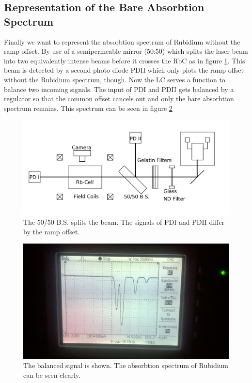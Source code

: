 \subsection{Representation of the Bare Absorbtion Spectrum}
Finally we want to represent the absorbtion spectrum of Rubidium without the ramp offset. By use of a semipermeable mirror (50:50) which splits the laser beam
into two equivalently intense beams before it crosses the RbC as in figure \ref{pic_setup3}. This beam is detected by a second photo diode PDII which only
plots the ramp offset without the Rubidium spectrum, though. Now the LC serves a function to balance two incoming signals. The input of PDI and PDII gets
balanced by a regulator so that the common offset cancels out and only the bare absorbtion spectrum remains. This spectrum can be seen in figure 
\ref{pic_spectrum}
\begin{figure}[H]
 \includegraphics[width=\textwidth]{../pics/setup3.png}
 \caption{The 50/50 B.S. splits the beam. The signals of PDI and PDII differ by the ramp offset.}
 \label{pic_setup3}
\end{figure}

\begin{figure}[H]
 \includegraphics[width=\textwidth]{../pics/spectrum.jpg}
 \caption{The balanced signal is shown. The absorbtion spectrum of Rubidium can be seen clearly.}
 \label{pic_spectrum}
\end{figure}

